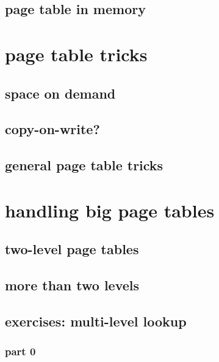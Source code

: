 

\subsection{page table in memory}


\section{page table tricks}

\subsection{space on demand}


\subsection{copy-on-write?} %



\subsection{general page table tricks}




\section{handling big page tables}


\subsection{two-level page tables}



\subsection{more than two levels}


\subsection{exercises: multi-level lookup}
\subsubsection{part 0}

